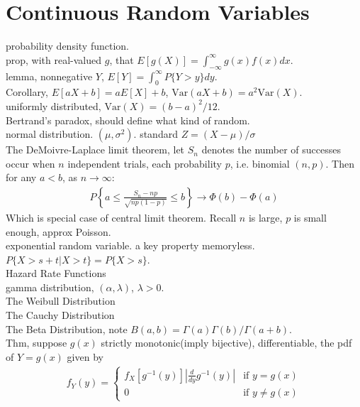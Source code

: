 \documentclass[paper=a4, fontsize=11pt]{scrartcl} %
\numberwithin{equation}{section} %
\numberwithin{figure}{section} %
\numberwithin{table}{section} %
\begin{document}
\section{Continuous Random Variables}
probability density function.\\
prop, with real-valued $g$, that $E[g(X)] = \int_{-\infty}^\infty g(x)f(x)dx$.\\
lemma, nonnegative $Y$, $E[Y]=\int_0^\infty P\{Y>y\}dy$.\\
Corollary, $E[aX+b] =aE[X]+b$, $\text{Var}(aX+b)=a^2\text{Var}(X)$.\\
uniformly distributed, $\text{Var}(X)=(b-a)^2/12$.\\
Bertrand's paradox, should define what kind of random.\\
normal distribution. $(\mu,\sigma^2)$. standard $Z =(X-\mu)/\sigma$\\
The DeMoivre-Laplace limit theorem, let  $S_n$ denotes the number of successes occur when $n$ independent trials, each probability $p$, i.e. binomial $(n,p)$. Then for any $a<b$, as $n\rightarrow \infty$:
\begin{align}
	P\left\{a\leq \frac{S_n-np}{\sqrt{np(1-p)}}\leq b\right\}\rightarrow \Phi(b) - \Phi(a)
\end{align}
Which is special case of central limit theorem. Recall $n$ is large, $p$ is small enough, approx Poisson.\\
exponential random variable. a key property memoryless. $P\{X>s+t|X>t\} = P\{X>s\}$.\\
Hazard Rate Functions\\
gamma distribution, $(\alpha,\lambda)$, $\lambda>0$.\\
The Weibull Distribution\\
The Cauchy Distribution\\
The Beta Distribution, note $B(a,b)=\Gamma(a)\Gamma(b)/\Gamma(a+b)$.\\
Thm, suppose $g(x)$ strictly monotonic(imply bijective), differentiable, the pdf of $Y=g(x)$ given by
\begin{align}
	f_Y(y)=\begin{cases} f_X[g^{-1}(y)]\left|\frac{d}{dy}g^{-1}(y)\right| & \mbox{if $y=g(x)$}\\
				0 & \mbox{if $y\neq g(x)$}\end{cases}
\end{align}
\end{document}
